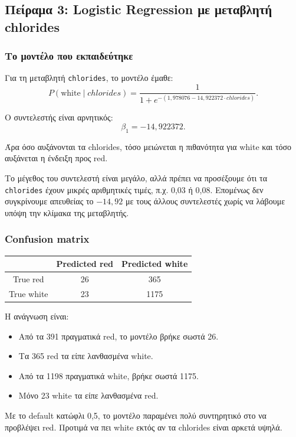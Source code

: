 \documentclass[11pt,a4paper]{article}
\newcommand{\code}[1]{\texttt{#1}}
\begin{document}
\subsection{Πείραμα 3: Logistic Regression με μεταβλητή chlorides}

\subsubsection{Το μοντέλο που εκπαιδεύτηκε}

Για τη μεταβλητή \code{chlorides}, το μοντέλο έμαθε:
\[
P(\text{white} \mid chlorides) =
\frac{1}{1 + e^{-(1{,}978076 - 14{,}922372 \cdot chlorides)}}.
\]

Ο συντελεστής είναι αρνητικός:
\[
\beta_1 = -14{,}922372.
\]

Άρα όσο αυξάνονται τα chlorides, τόσο μειώνεται η πιθανότητα για white και
τόσο αυξάνεται η ένδειξη προς red.

Το μέγεθος του συντελεστή είναι μεγάλο, αλλά πρέπει να προσέξουμε ότι τα
\code{chlorides} έχουν μικρές αριθμητικές τιμές, π.χ. 0,03 ή 0,08. Επομένως
δεν συγκρίνουμε απευθείας το \(-14{,}92\) με τους άλλους συντελεστές χωρίς
να λάβουμε υπόψη την κλίμακα της μεταβλητής.

\subsubsection{Confusion matrix}

\begin{center}
\begin{tabular}{c|cc}
\toprule
 & Predicted red & Predicted white \\
\midrule
True red & 26 & 365 \\
True white & 23 & 1175 \\
\bottomrule
\end{tabular}
\end{center}

Η ανάγνωση είναι:
\begin{itemize}
    \item Από τα 391 πραγματικά red, το μοντέλο βρήκε σωστά 26.
    \item Τα 365 red τα είπε λανθασμένα white.
    \item Από τα 1198 πραγματικά white, βρήκε σωστά 1175.
    \item Μόνο 23 white τα είπε λανθασμένα red.
\end{itemize}

Με το default κατώφλι 0,5, το μοντέλο παραμένει πολύ συντηρητικό στο να
προβλέψει red. Προτιμά να πει white εκτός αν τα chlorides είναι αρκετά
υψηλά.
\end{document}
